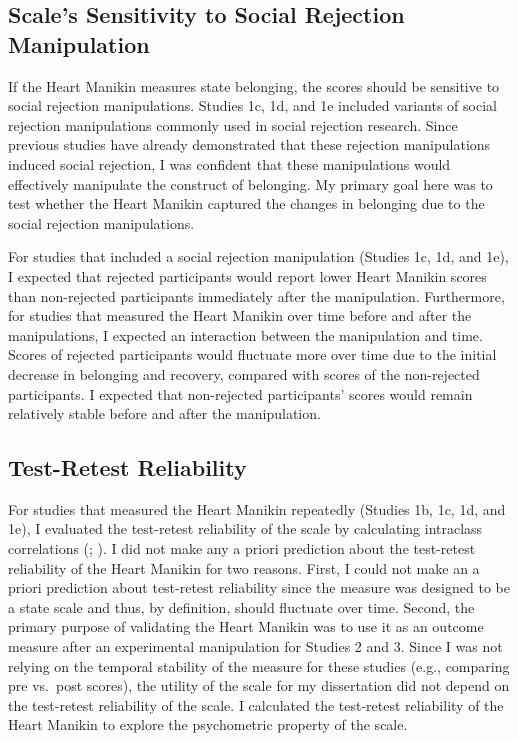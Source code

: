 \documentclass[
]{udthesis}
\begin{document}
\subsection{Scale's Sensitivity to Social Rejection Manipulation}\label{scales-sensitivity-to-social-rejection-manipulation}

If the Heart Manikin measures state belonging, the scores should be
sensitive to social rejection manipulations. Studies 1c, 1d, and 1e
included variants of social rejection manipulations commonly used in
social rejection research. Since previous studies have already demonstrated
that these rejection manipulations induced social rejection, I was confident that these
manipulations would effectively manipulate the construct of belonging.
My primary goal here was to test whether the Heart Manikin captured the
changes in belonging due to the social rejection manipulations.

For studies that included a social rejection manipulation (Studies 1c,
1d, and 1e), I expected that rejected participants would report lower
Heart Manikin scores than non-rejected participants immediately after
the manipulation. Furthermore, for studies that measured the Heart
Manikin over time before and after the manipulations, I expected an
interaction between the manipulation and time. Scores of rejected
participants would fluctuate more over time due to the initial decrease
in belonging and recovery, compared with scores of the non-rejected
participants. I expected that non-rejected participants' scores would
remain relatively stable before and after the manipulation.

\subsection{Test-Retest Reliability}\label{test-retest-reliability}

For studies that measured the Heart Manikin repeatedly (Studies 1b, 1c,
1d, and 1e), I evaluated the test-retest reliability of the scale by
calculating intraclass correlations (; ). I did not
make any a priori prediction about the test-retest reliability of the
Heart Manikin for two reasons. First, I could not make an a priori
prediction about test-retest reliability since the measure was designed
to be a state scale and thus, by definition, should fluctuate over time.
Second, the primary purpose of validating the Heart Manikin was to use
it as an outcome measure after an experimental manipulation for Studies
2 and 3. Since I was not relying on the temporal stability of the
measure for these studies (e.g., comparing pre vs.~post scores), the
utility of the scale for my dissertation did not depend on the
test-retest reliability of the scale. I calculated the test-retest
reliability of the Heart Manikin to explore the psychometric property of
the scale.
\end{document}
